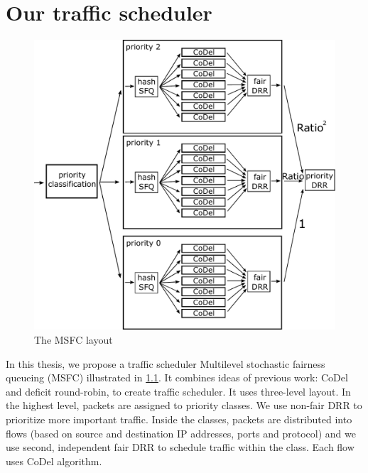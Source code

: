 \chapter{Our traffic scheduler}
\label{chap02}

\begin{figure}
	\centering
	\includegraphics[width=137mm]{drawings/msfc}
	\caption{The MSFC layout}
	\label{fig10:msfc}
\end{figure}

In this thesis, we propose a traffic scheduler Multilevel stochastic fairness queueing (MSFC) illustrated in \ref{fig10:msfc}. It combines ideas of previous work: CoDel and deficit round-robin, to create traffic scheduler. It uses three-level layout. In the highest level, packets are assigned to priority classes. We use non-fair DRR to prioritize more important traffic. Inside the classes, packets are distributed into flows (based on source and destination IP addresses, ports and protocol) and we use second, independent fair DRR to schedule traffic within the class. Each flow uses CoDel algorithm.

